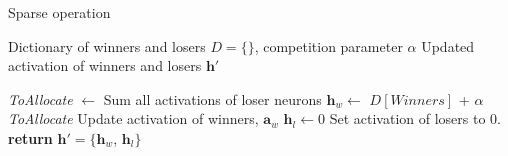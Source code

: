 %
%
%
%
%

\begin{algorithm}
    \caption{Sparse operation}
    \label{algo:sparse}
    \begin{algorithmic}[1]
    
    \INPUT Dictionary of winners and losers $D = \{\}$, competition parameter $\alpha$
    \OUTPUT Updated activation of winners and losers $\mathbf{h}'$

    \item[]
    \State \textit{ToAllocate} $\gets$ 
    \Comment Sum all activations of loser neurons
    \State $\mathbf{h}_{w} \gets$ $D[Winners]$ + $\alpha$ \textit{ToAllocate}
    \Comment Update activation of winners, $\mathbf{a}_{w}$
    \State $\mathbf{h}_{l} \gets 0$ 
    \Comment Set activation of losers to $0$.
    \State \textbf{return} $\mathbf{h}' = \{\mathbf{h}_{w}$, $\mathbf{h}_{l}\}$
    \end{algorithmic}
\end{algorithm}
